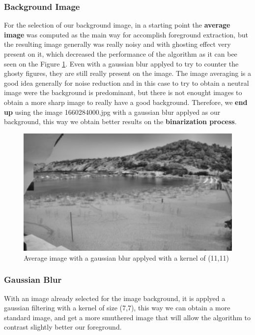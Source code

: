 \documentclass[10pt]{article}
\begin{document}
\FloatBarrier
\subsubsection*{Background Image}

For the selection of our background image, in a starting point the \textbf{average image} was computed as the main way for accomplish foreground extraction, but the resulting image generally was really noisy and with ghosting effect very present on it, which decreased the performance of the algorithm as it can bee seen on the Figure \ref{fig:avg}. Even with a gaussian blur applyed to try to counter the ghosty figures, they are still really present on the image. The image averaging is a good idea generally for noise reduction and in this case to try to obtain a neutral image were the background is predominant, but there is not enought images to obtain a more sharp image to really have a good background. Therefore, we \textbf{end up} using the image 1660284000.jpg with a gaussian blur applyed as our background, this way we obtain better results on the \textbf{binarization process}.

\begin{figure}[h]
    \centering
    \includegraphics[width=\textwidth]{img/avg.png}
    \caption{Average image with a gaussian blur applyed with a kernel of (11,11)}
    \label{fig:avg}
\end{figure}

\afterpage{\FloatBarrier}

\subsubsection*{Gaussian Blur}
With an image already selected for the image background, it is applyed a gaussian filtering with a kernel of size (7,7), this way  we can obtain a more standard image, and get a more smuthered image that will allow the algorithm to contrast slightly better our foreground.\newline
\end{document}
